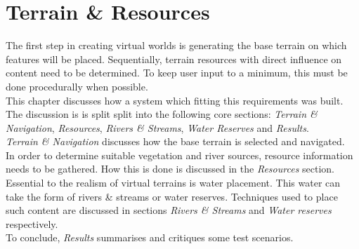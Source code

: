 \chapter{Terrain \& Resources}

The first step in creating virtual worlds is generating the base terrain on which features will be placed. Sequentially, terrain resources with direct influence on content need to be determined. To keep user input to a minimum, this must be done procedurally when possible. \\
This chapter discusses how a system which fitting this requirements was built. The discussion is is split split into the following core sections: \textit{Terrain \& Navigation}, \textit{Resources}, \textit{Rivers \& Streams}, \textit{Water Reserves} and \textit{Results}.\\
\textit{Terrain \& Navigation} discusses how the base terrain is selected and navigated. \\
In order to determine suitable vegetation and river sources, resource information needs to be gathered. How this is done is discussed in the \textit{Resources} section.\\
Essential to the realism of virtual terrains is water placement. This water can take the form of rivers \& streams or water reserves. Techniques used to place such content are discussed in sections \textit{Rivers \& Streams} and \textit{Water reserves} respectively.\\
To conclude, \textit{Results} summarises and critiques some test scenarios.

